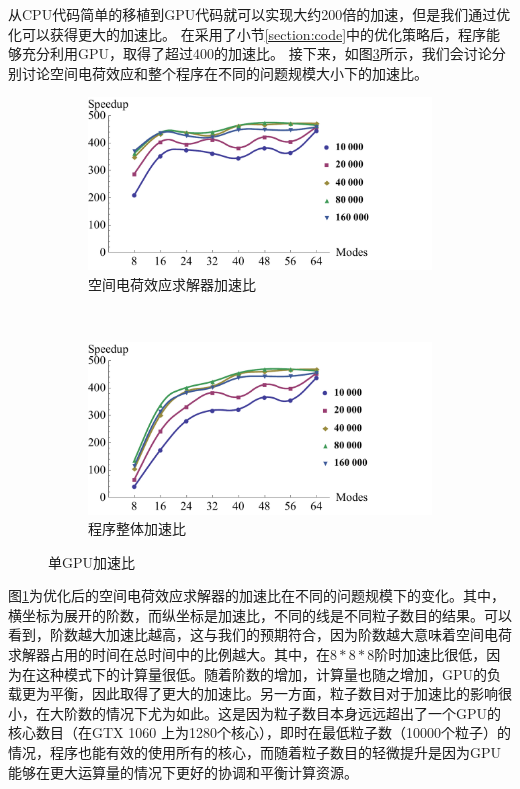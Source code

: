 从CPU代码简单的移植到GPU代码就可以实现大约200倍的加速，但是我们通过优化可以获得更大的加速比。
在采用了小节\ref{section:code}中的优化策略后，程序能够充分利用GPU，取得了超过400的加速比。
接下来，如图\ref{fig:OneGPU}所示，我们会讨论分别讨论空间电荷效应和整个程序在不同的问题规模大小下的加速比。

\begin{figure}[!htb]
    \centering
    \begin{subfigure}[b]{0.9\textwidth}
        \includegraphics[width=\textwidth]{plot/SpaceChargeGPU11th_large.pdf}
        \caption{空间电荷效应求解器加速比}
        \label{fig:SCOpt}
    \end{subfigure}
    \quad
    ~ %
    \begin{subfigure}[b]{0.9\textwidth}
        \includegraphics[width=\textwidth]{plot/TotalGPU11th_large.pdf}
        \caption{程序整体加速比}
        \label{fig:TotalOpt}
    \end{subfigure}
    \caption{单GPU加速比}\label{fig:OneGPU}
\end{figure}

图\ref{fig:SCOpt}为优化后的空间电荷效应求解器的加速比在不同的问题规模下的变化。其中，横坐标为展开的阶数，而纵坐标是加速比，不同的线是不同粒子数目的结果。可以看到，阶数越大加速比越高，这与我们的预期符合，因为阶数越大意味着空间电荷求解器占用的时间在总时间中的比例越大。其中，在$8*8*8$阶时加速比很低，因为在这种模式下的计算量很低。随着阶数的增加，计算量也随之增加，GPU的负载更为平衡，因此取得了更大的加速比。另一方面，粒子数目对于加速比的影响很小，在大阶数的情况下尤为如此。这是因为粒子数目本身远远超出了一个GPU的核心数目（在GTX 1060 上为1280个核心），即时在最低粒子数（10000个粒子）的情况，程序也能有效的使用所有的核心，而随着粒子数目的轻微提升是因为GPU能够在更大运算量的情况下更好的协调和平衡计算资源。

